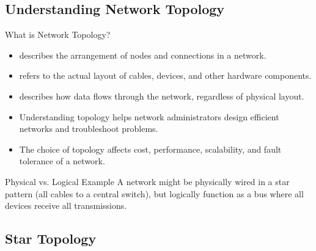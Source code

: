 \documentclass[aspectratio=169]{beamer}  %
\begin{document}

\subsection{Understanding Network Topology}


\begin{frame}{What is Network Topology?}
    \begin{itemize}
        \item {} describes the arrangement of nodes and connections in a network.
        \item {} refers to the actual layout of cables, devices, and other hardware components.
        \item {} describes how data flows through the network, regardless of physical layout.
        \item Understanding topology helps network administrators design efficient networks and troubleshoot problems.
        \item The choice of topology affects cost, performance, scalability, and fault tolerance of a network.
    \end{itemize}
    
    \begin{block}{Physical vs. Logical Example}
        A network might be physically wired in a star pattern (all cables to a central switch), but logically function as a bus where all devices receive all transmissions.
    \end{block}
\end{frame}

\subsection{Star Topology}
\end{document}

